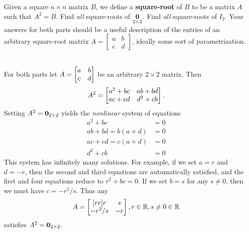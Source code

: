Given a square $n\times n$ matrix $B$, we define a {\bf square-root} of $B$ to be a matrix $A$ such that $A^2=B$. 
\bb
\ii Find {\em all} square-roots of $\underset{2\times 2}{{\mathbf 0}}$. 
\ii Find {\em all} square-roots of $I_2$. 
\ee 
Your answers for both parts should be a useful description of the entries of an arbitrary square-root matrix $A=\begin{bmatrix}
a&b\\
c&d
\end{bmatrix}$, ideally some sort of parametrization.  \ \\
\begin{solution}
\noindent
For both parts let $A=\begin{bmatrix}a&b\\ c&d \end{bmatrix}$ be an arbitrary $2\times 2$ matrix. Then 
\[
A^2=\begin{bmatrix}a^2+bc&ab+bd\\ ac+cd&d^2+cb \end{bmatrix}.
\]
Setting $A^2={\mathbf 0}_{2\times 2}$ yields the {\em nonlinear} system of equations 
\begin{align*}
a^2+bc&=0\\
ab+bd=b(a+d)&=0\\
ac+cd=c(a+d)&=0\\
d^2+cb&=0
\end{align*}
This system has infinitely many solutions. For example, if we set $a=r$ and $d=-r$, then the second and third equations are automatically satisfied, and the first and four equations reduce to $r^2+bc=0$. If we set $b=s$ for any $s\ne 0$, then we must have $c=-r^2/s$. Thus any 
\[
A=\begin{bmatrix}[rr]
r&s\\
-r^2/s& -r
\end{bmatrix}, r\in {\mathbb R}, s\ne 0\in {\mathbb R}
\]
satisfies $A^2={\mathbf 0}_{2\times 2}$.


\end{solution}
